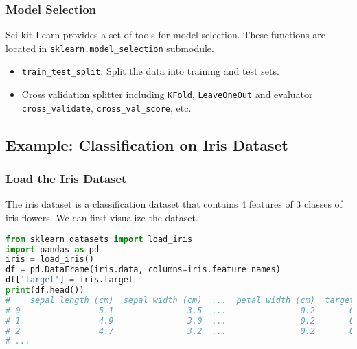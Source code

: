 \documentclass[beamer, en, version=2.0]{huangfusl-template}
\begin{document}
    \begin{frame}[fragile]
        \frametitle{Model Selection}

        Sci-kit Learn provides a set of tools for model selection. These functions are located in {\footnotesize\color{darkred}\verb|sklearn.model_selection|} submodule.

        \begin{itemize}
            \item {\color{blue}\footnotesize\verb|train_test_split|}: Split the data into training and test sets.
            \item Cross validation splitter including {\color{blue}\footnotesize\verb|KFold|}, {\color{blue}\footnotesize\verb|LeaveOneOut|} and evaluator {\color{blue}\footnotesize\verb|cross_validate|}, {\color{blue}\footnotesize\verb|cross_val_score|}, etc.
        \end{itemize}
    \end{frame}

    \subsection{Example: Classification on Iris Dataset}

    \begin{frame}[fragile]
        \frametitle{Load the Iris Dataset}

        The iris dataset is a classification dataset that contains 4 features of 3 classes of iris flowers. We can first visualize the dataset.

\begin{lstlisting}[language=python]
from sklearn.datasets import load_iris
import pandas as pd
iris = load_iris()
df = pd.DataFrame(iris.data, columns=iris.feature_names)
df['target'] = iris.target
print(df.head())
#    sepal length (cm)  sepal width (cm)  ...  petal width (cm)  target
# 0                5.1               3.5  ...               0.2       0
# 1                4.9               3.0  ...               0.2       0
# 2                4.7               3.2  ...               0.2       0
# ...
\end{lstlisting}

    \end{frame}
\end{document}
